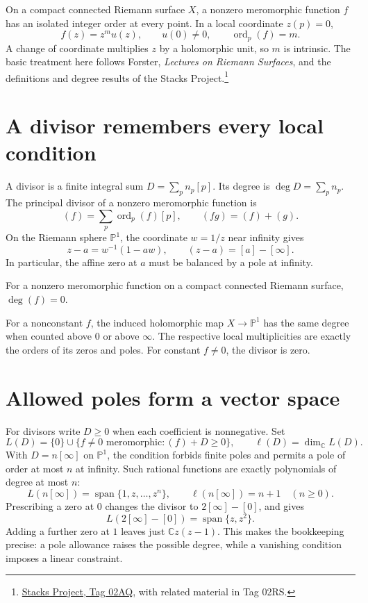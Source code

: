 
On a compact connected Riemann surface \(X\), a nonzero meromorphic function \(f\) has an isolated integer order at every point. In a local coordinate \(z(p)=0\),
\[
 f(z)=z^m u(z),\qquad u(0)\ne0,\qquad \operatorname{ord}_p(f)=m.
\]
A change of coordinate multiplies \(z\) by a holomorphic unit, so \(m\) is intrinsic. The basic treatment here follows Forster, \emph{Lectures on Riemann Surfaces}, and the definitions and degree results of the Stacks Project.\footnote{\href{https://stacks.math.columbia.edu/tag/02AQ}{Stacks Project, Tag 02AQ}, with related material in Tag 02RS.}

\section{A divisor remembers every local condition}

A divisor is a finite integral sum \(D=\sum_p n_p[p]\). Its degree is \(\deg D=\sum_p n_p\). The principal divisor of a nonzero meromorphic function is
\[
 (f)=\sum_p\operatorname{ord}_p(f)[p],\qquad
 (fg)=(f)+(g).
\]
On the Riemann sphere \(\mathbb P^1\), the coordinate \(w=1/z\) near infinity gives
\[
 z-a=w^{-1}(1-aw),\qquad
 (z-a)=[a]-[\infty].
\]
In particular, the affine zero at \(a\) must be balanced by a pole at infinity.

\begin{theorem}
For a nonzero meromorphic function on a compact connected Riemann surface, \(\deg(f)=0\).
\end{theorem}
For a nonconstant \(f\), the induced holomorphic map \(X\to\mathbb P^1\) has the same degree when counted above \(0\) or above \(\infty\). The respective local multiplicities are exactly the orders of its zeros and poles. For constant \(f\ne0\), the divisor is zero.

\section{Allowed poles form a vector space}

For divisors write \(D\ge0\) when each coefficient is nonnegative. Set
\[
 L(D)=\{0\}\cup\{f\ne0\text{ meromorphic}:(f)+D\ge0\},
 \qquad\ell(D)=\dim_{\mathbb C}L(D).
\]
With \(D=n[\infty]\) on \(\mathbb P^1\), the condition forbids finite poles and permits a pole of order at most \(n\) at infinity. Such rational functions are exactly polynomials of degree at most \(n\):
\[
 L(n[\infty])=\operatorname{span}\{1,z,\ldots,z^n\},
 \qquad\ell(n[\infty])=n+1\quad(n\ge0).
\]
Prescribing a zero at \(0\) changes the divisor to \(2[\infty]-[0]\), and gives
\[
 L(2[\infty]-[0])=\operatorname{span}\{z,z^2\}.
\]
Adding a further zero at \(1\) leaves just \(\mathbb C z(z-1)\). This makes the bookkeeping precise: a pole allowance raises the possible degree, while a vanishing condition imposes a linear constraint.

